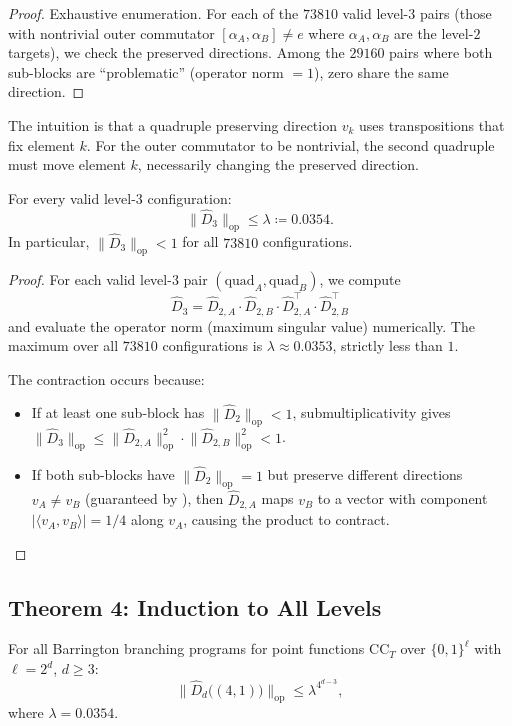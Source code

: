 \documentclass[version=submission]{iacrcc}
\newcommand{\norm}[1]{\lVert #1 \rVert}
\newcommand{\abs}[1]{\lvert #1 \rvert}
\newcommand{\opn}[1]{\norm{#1}_{\mathrm{op}}}
\newcommand{\Dhat}{\widehat{D}}
\newcommand{\CC}{\mathrm{CC}}
\begin{document}
\begin{proof}
Exhaustive enumeration. For each of the $73810$ valid level-$3$ pairs
(those with nontrivial outer commutator $[\alpha_A, \alpha_B] \neq e$ where
$\alpha_A, \alpha_B$ are the level-$2$ targets), we check the preserved
directions. Among the $29160$ pairs where both sub-blocks are ``problematic''
(operator norm $= 1$), zero share the same direction.
\end{proof}

The intuition is that a quadruple preserving direction $v_k$ uses transpositions
that fix element $k$. For the outer commutator to be nontrivial, the second
quadruple must move element $k$, necessarily changing the preserved direction.

\begin{theorem}
\label{thm:level23}
For every valid level-$3$ configuration:
\[
\opn{\Dhat_3} \leq \lambda \coloneqq 0.0354.
\]
In particular, $\opn{\Dhat_3} < 1$ for all $73810$ configurations.
\end{theorem}

\begin{proof}
For each valid level-$3$ pair $(\mathrm{quad}_A, \mathrm{quad}_B)$, we compute
\[
\Dhat_3 = \Dhat_{2,A} \cdot \Dhat_{2,B} \cdot \Dhat_{2,A}^\top \cdot \Dhat_{2,B}^\top
\]
and evaluate the operator norm (maximum singular value) numerically. The maximum
over all $73810$ configurations is $\lambda \approx 0.0353$, strictly less than $1$.

The contraction occurs because:
\begin{itemize}[nosep]
\item If at least one sub-block has $\opn{\Dhat_2} < 1$, submultiplicativity gives
  $\opn{\Dhat_3} \leq \opn{\Dhat_{2,A}}^2 \cdot \opn{\Dhat_{2,B}}^2 < 1$.
\item If both sub-blocks have $\opn{\Dhat_2} = 1$ but preserve different directions
  $v_A \neq v_B$ (guaranteed by ), then $\Dhat_{2,A}$ maps $v_B$
  to a vector with component $\abs{\langle v_A, v_B \rangle} = 1/4$ along $v_A$,
  causing the product to contract. \qedhere
\end{itemize}
\end{proof}


\subsection{Theorem 4: Induction to All Levels}

\begin{theorem}
\label{thm:induction}
For all Barrington branching programs for point functions $\CC_T$ over
$\{0,1\}^\ell$ with $\ell = 2^d$, $d \geq 3$:
\[
\opn{\Dhat_d\bigl((4,1)\bigr)} \leq \lambda^{4^{d-3}},
\]
where $\lambda = 0.0354$.
\end{theorem}
\end{document}

